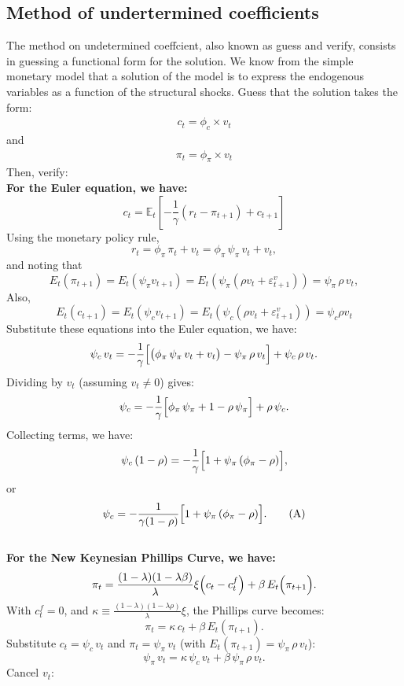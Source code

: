 \documentclass[12pt]{article}
\begin{document}
\subsection{Method of undertermined coefficients}
The method on undetermined coeffcient, also known as guess and verify, consists in guessing a functional form for the solution. We know from the simple monetary model that a solution of the model is to express the endogenous variables as a function of the structural shocks. Guess that the solution takes the form:\\
\begin{align*}
    c_t=\phi_c \times v_t 
\end{align*}
and
\begin{align*}
    \pi_t=\phi_\pi \times v_t
\end{align*}
Then, verify:\\
\textbf{For the Euler equation, we have:}\\
\[
c_t = \mathbb{E}_t[-\frac{1}{\gamma}(r_t-\pi_{t+1})+c_{t+1}]
\]
Using the monetary policy rule,
\[
r_t = \phi_\pi\,\pi_t + v_t = \phi_\pi\,\psi_\pi\,v_t + v_t,
\]
and noting that
\[
 E_t(\pi_{t+1}) = E_t(\psi_{\pi} v_{t+1})= E_t(\psi_\pi(\rho v_t+\varepsilon_{t+1}^v))=\psi_\pi\,\rho\,v_t,
\]
Also,
\[
E_t(c_{t+1})=E_t(\psi_c v_{t+1})=E_t(\psi_c(\rho v_t+\varepsilon_{t+1}^v))=\psi_c\rho v_t
\]
Substitute these equations into the Euler equation, we have:\\
\[
\psi_c\,v_t = -\frac{1}{\gamma}\Bigl[\bigl(\phi_\pi\,\psi_\pi\,v_t + v_t\bigr) - \psi_\pi\,\rho\,v_t\Bigr] + \psi_c\,\rho\,v_t.
\]
Dividing by \(v_t\) (assuming \(v_t\neq0\)) gives:
\[
\psi_c = -\frac{1}{\gamma}\Bigl[\phi_\pi\,\psi_\pi + 1 - \rho\,\psi_\pi\Bigr] + \rho\,\psi_c.
\]
Collecting terms, we have:
\[
\psi_c\,(1-\rho) = -\frac{1}{\gamma}\Bigl[1 + \psi_\pi\,( \phi_\pi - \rho)\Bigr],
\]
or
\[
\psi_c = -\frac{1}{\gamma(1-\rho)}\Bigl[1 + \psi_\pi\,( \phi_\pi - \rho)\Bigr]. \tag{A}
\]\\
\textbf{For the New Keynesian Phillips Curve, we have:}\\
\[
\pi_t = \frac{(1-\lambda)(1-\lambda\beta)}{\lambda}\xi\Bigl(c_t - c_t^f\Bigr) + \beta\,E_t\Bigl(\pi_{t+1}\Bigr).
\]
With \( c_t^f=0 \), and $\kappa \equiv \frac{(1-\lambda)(1-\lambda\rho)}{\lambda}\xi$, the Phillips curve becomes:
\[
\pi_t = \kappa\,c_t + \beta\,E_t(\pi_{t+1}).
\]
Substitute \( c_t = \psi_c\,v_t \) and \( \pi_t = \psi_\pi\,v_t \) (with \( E_t(\pi_{t+1}) = \psi_\pi\,\rho\,v_t \)):
\[
\psi_\pi\,v_t = \kappa\,\psi_c\,v_t + \beta\,\psi_\pi\,\rho\,v_t.
\]
Cancel \(v_t\):
\end{document}
